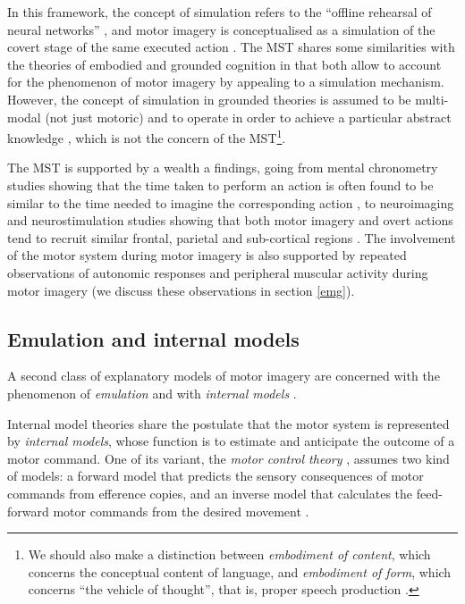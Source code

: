 \documentclass[a4paper,11pt,oneside,oldfontcommands]{memoir}
\let\rmarkdownfootnote\footnote%
\def\footnote{\protect\rmarkdownfootnote}
\begin{document}
In this framework, the concept of simulation refers to the ``offline
rehearsal of neural networks'' \citep{jeannerod_motor_2006}, and motor
imagery is conceptualised as a simulation of the covert stage of the
same executed action \citep{oshea_does_2017}. The MST shares some
similarities with the theories of embodied and grounded cognition
\citep{barsalou_grounded_2008} in that both allow to account for the
phenomenon of motor imagery by appealing to a simulation mechanism.
However, the concept of simulation in grounded theories is assumed to be
multi-modal (not just motoric) and to operate in order to achieve a
particular abstract knowledge \citep{oshea_does_2017}, which is not the
concern of the MST\footnote{We should also make a distinction between
  \emph{embodiment of content}, which concerns the conceptual content of
  language, and \emph{embodiment of form}, which concerns ``the vehicle
  of thought'', that is, proper speech production
  \citep{pickering_integrated_2013}.}.

The MST is supported by a wealth a findings, going from mental
chronometry studies showing that the time taken to perform an action is
often found to be similar to the time needed to imagine the
corresponding action \citep[though not always, see][for a review of
controversial findings and for an alternative conceptualisation of motor
imagery]{glover_motor-cognitive_2017}, to neuroimaging and
neurostimulation studies showing that both motor imagery and overt
actions tend to recruit similar frontal, parietal and sub-cortical
regions \citep[e.g.,][]{hetu_neural_2013, jeannerod_neural_2001}. The
involvement of the motor system during motor imagery is also supported
by repeated observations of autonomic responses and peripheral muscular
activity during motor imagery (we discuss these observations in section
\ref{emg}).

\subsection{Emulation and internal
models}\label{emulation-and-internal-models}

A second class of explanatory models of motor imagery are concerned with
the phenomenon of \emph{emulation} and with \emph{internal models}
\citep[see][for a review of the similarities and dissimilarities of
simulation and emulation models]{gentsch_towards_2016}.

Internal model theories share the postulate that the motor system is
represented by \emph{internal models}, whose function is to estimate and
anticipate the outcome of a motor command. One of its variant, the
\emph{motor control theory}
\citep[e.g.,][]{kawato_internal_1999, wolpert_internal_1995}, assumes
two kind of models: a forward model that predicts the sensory
consequences of motor commands from efference copies, and an inverse
model that calculates the feed-forward motor commands from the desired
movement \citep{gentsch_towards_2016}.
\end{document}
